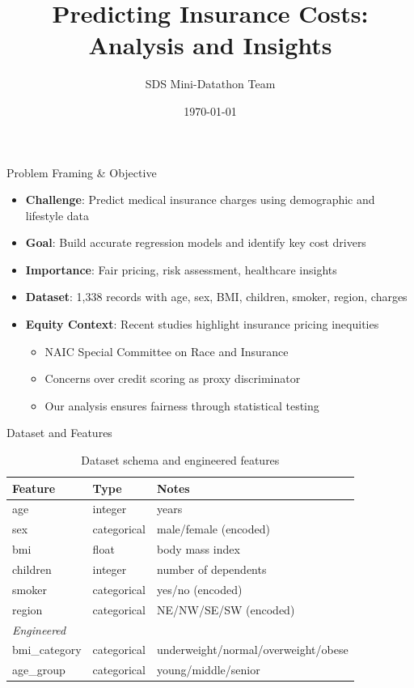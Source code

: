 \documentclass[10pt]{beamer}
\title{Predicting Insurance Costs: Analysis and Insights}
\author{SDS Mini-Datathon Team}
\institute[NUS]{National University of Singapore}
\date{\today}
\begin{document}
\begin{frame}
\titlepage
\end{frame}

\begin{frame}{Problem Framing \& Objective}
\begin{itemize}
\item \textbf{Challenge}: Predict medical insurance charges using demographic and lifestyle data
\item \textbf{Goal}: Build accurate regression models and identify key cost drivers
\item \textbf{Importance}: Fair pricing, risk assessment, healthcare insights
\item \textbf{Dataset}: 1,338 records with age, sex, BMI, children, smoker, region, charges
\item \textbf{Equity Context}: Recent studies highlight insurance pricing inequities
  \begin{itemize}
  \item NAIC Special Committee on Race and Insurance
  \item Concerns over credit scoring as proxy discriminator
  \item Our analysis ensures fairness through statistical testing
  \end{itemize}
\end{itemize}
\end{frame}

\begin{frame}{Dataset and Features}
\small
\begin{table}[h]
\centering
\begin{tabular}{@{}lll@{}}
\toprule
Feature & Type & Notes \\
\midrule
age & integer & years \\
sex & categorical & male/female (encoded) \\
bmi & float & body mass index \\
children & integer & number of dependents \\
smoker & categorical & yes/no (encoded) \\
region & categorical & NE/NW/SE/SW (encoded) \\
\midrule
\textit{Engineered} & & \\
bmi\_category & categorical & underweight/normal/overweight/obese \\
age\_group & categorical & young/middle/senior \\
\bottomrule
\end{tabular}
\caption{Dataset schema and engineered features}
\end{table}
\end{frame}
\end{document}

